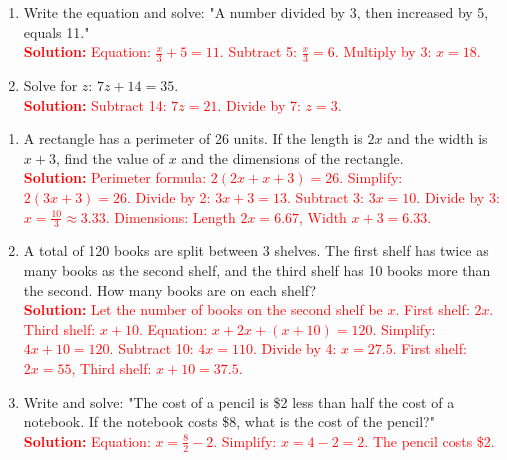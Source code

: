 \documentclass[12pt]{article}
\begin{document}
\begin{tcolorbox}[colframe=black!60, colback=white, 
coltitle=black, colbacktitle=black!15, fonttitle=\bfseries\Large, 
title=Exercises, halign title=center, left=10pt, right=10pt, top=10pt, bottom=60pt]
\begin{enumerate}[itemsep=3em]
    \item Write the equation and solve: "A number divided by 3, then increased by 5, equals 11."\\
    \textcolor{red}{\textbf{Solution:} Equation: \( \frac{x}{3} + 5 = 11 \). Subtract 5: \( \frac{x}{3} = 6 \). Multiply by 3: \( x = 18 \).}

    \item Solve for \(z\): \( 7z + 14 = 35 \).\\
    \textcolor{red}{\textbf{Solution:} Subtract 14: \( 7z = 21 \). Divide by 7: \( z = 3 \).}
\end{enumerate}
\end{tcolorbox}


\begin{tcolorbox}[colframe=black!60, colback=white, 
coltitle=black, colbacktitle=black!15, fonttitle=\bfseries\Large, 
title=Problems, halign title=center, left=10pt, right=10pt, top=10pt, bottom=60pt]
\begin{enumerate}[start=9, itemsep=2em]
    \item A rectangle has a perimeter of 26 units. If the length is \(2x\) and the width is \(x + 3\), find the value of \(x\) and the dimensions of the rectangle.\\
    \textcolor{red}{\textbf{Solution:} Perimeter formula: \( 2(2x + x + 3) = 26 \). Simplify: \( 2(3x + 3) = 26 \). Divide by 2: \( 3x + 3 = 13 \). Subtract 3: \( 3x = 10 \). Divide by 3: \( x = \frac{10}{3} \approx 3.33 \). Dimensions: Length \(2x = 6.67\), Width \(x + 3 = 6.33\).}

    \item A total of 120 books are split between 3 shelves. The first shelf has twice as many books as the second shelf, and the third shelf has 10 books more than the second. How many books are on each shelf?\\
    \textcolor{red}{\textbf{Solution:} Let the number of books on the second shelf be \(x\). First shelf: \(2x\). Third shelf: \(x + 10\). Equation: \( x + 2x + (x + 10) = 120 \). Simplify: \( 4x + 10 = 120 \). Subtract 10: \( 4x = 110 \). Divide by 4: \( x = 27.5 \). First shelf: \(2x = 55\), Third shelf: \(x + 10 = 37.5\).}

    \item Write and solve: "The cost of a pencil is \$2 less than half the cost of a notebook. If the notebook costs \$8, what is the cost of the pencil?"\\
    \textcolor{red}{\textbf{Solution:} Equation: \( x = \frac{8}{2} - 2 \). Simplify: \( x = 4 - 2 = 2 \). The pencil costs \$2.}


\end{enumerate}
\end{tcolorbox}
\end{document}
